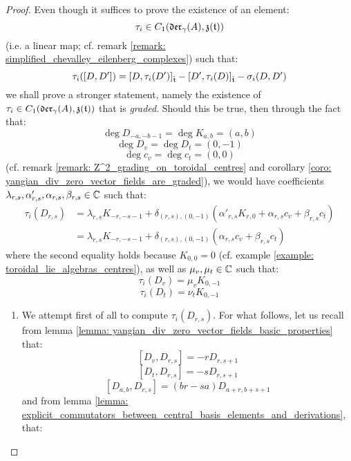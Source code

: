            \begin{proof}
                Even though it suffices to prove the existence of an element:
                    $$\tau_i \in C_1(\mathfrak{der}_{\gamma}(A), \mathfrak{z}(\mathfrak{t}))$$
                (i.e. a linear map; cf. remark \ref{remark: simplified_chevalley_eilenberg_complexes}) such that:
                    $$\tau_i([D, D']) = [D, \tau_i(D')]_{\hat{\mathfrak{t}}} - [D', \tau_i(D)]_{\hat{\mathfrak{t}}} - \sigma_i(D, D')$$
                we shall prove a stronger statement, namely the existence of $\tau_i \in C_1(\mathfrak{der}_{\gamma}(A), \mathfrak{z}(\mathfrak{t}))$ that is \textit{graded}. Should this be true, then through the fact that:
                    $$\deg D_{-a, -b - 1} = \deg K_{a, b} = (a, b)$$
                    $$\deg D_v = \deg D_t = (0, -1)$$
                    $$\deg c_v = \deg c_t = (0, 0)$$
                (cf. remark \ref{remark: Z^2_grading_on_toroidal_centres} and corollary \ref{coro: yangian_div_zero_vector_fields_are_graded}), we would have coefficients $\lambda_{r, s}, \alpha'_{r, s}, \alpha_{r, s}, \beta_{r, s} \in \mathbb{C}$ such that:
                    $$
                        \begin{aligned}
                            \tau_i(D_{r, s}) & = \lambda_{r, s} K_{-r, -s - 1} + \delta_{(r, s), (0, -1)} ( \alpha'_{r, s} K_{r, 0} + \alpha_{r, s} c_v + \beta_{r, s} c_t )
                            \\
                            & = \lambda_{r, s} K_{-r, -s - 1} + \delta_{(r, s), (0, -1)} ( \alpha_{r, s} c_v + \beta_{r, s} c_t )
                        \end{aligned}
                    $$
                where the second equality holds because $K_{0, 0} = 0$ (cf. example \ref{example: toroidal_lie_algebras_centres}), as well as $\mu_v, \mu_t \in \mathbb{C}$ such that:
                    $$\tau_i(D_v) = \mu_v K_{0, -1}$$
                    $$\tau_i(D_t) = \nu_t K_{0, -1}$$
                \begin{enumerate}
                    \item We attempt first of all to compute $\tau_i(D_{r, s})$. For what follows, let us recall from lemma \ref{lemma: yangian_div_zero_vector_fields_basic_properties} that:
                        $$[D_v, D_{r, s}] = -r D_{r, s + 1}$$
                        $$[D_t, D_{r, s}] = -s D_{r, s + 1}$$
                        $$[D_{a, b}, D_{r, s}] = (br - sa) D_{a + r, b + s + 1}$$
                    and from lemma \ref{lemma: explicit_commutators_between_central_basis_elements_and_derivations}, that:

\end{enumerate}
\end{proof}
